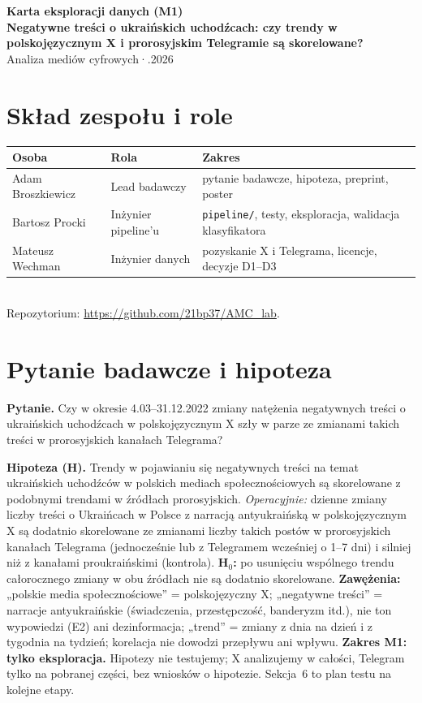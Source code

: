 \documentclass[10pt,a4paper]{article}
\newcommand{\repo}{\url{https://github.com/21bp37/AMC_lab}}
\begin{document}
\begin{center}
{\large\bfseries Karta eksploracji danych (M1)}\\[2pt]
{\bfseries Negatywne treści o ukraińskich uchodźcach: czy trendy w polskojęzycznym X i prorosyjskim Telegramie są skorelowane?}\\[1pt]
\small Analiza mediów cyfrowych\quad·.2026
\end{center}

\section{Skład zespołu i role}
\begin{tabularx}{\linewidth}{@{}llX@{}}
\toprule
Osoba & Rola & Zakres \\
\midrule
Adam Broszkiewicz & Lead badawczy & pytanie badawcze, hipoteza, preprint, poster \\
Bartosz Procki & Inżynier pipeline'u & \texttt{pipeline/}, testy, eksploracja, walidacja klasyfikatora \\
Mateusz Wechman & Inżynier danych & pozyskanie X i Telegrama, licencje, decyzje D1--D3 \\
\bottomrule
\end{tabularx}\\[2pt]
Repozytorium: \repo{}.

\section{Pytanie badawcze i hipoteza}
\textbf{Pytanie.} Czy w okresie 4.03--31.12.2022 zmiany natężenia negatywnych treści o ukraińskich uchodźcach
w polskojęzycznym X szły w parze ze zmianami takich treści w prorosyjskich kanałach Telegrama?

\textbf{Hipoteza (H).} Trendy w pojawianiu się negatywnych treści na temat ukraińskich uchodźców w polskich mediach
społecznościowych są skorelowane z podobnymi trendami w źródłach prorosyjskich. \emph{Operacyjnie:} dzienne zmiany
liczby treści o Ukraińcach w Polsce z narracją antyukraińską w polskojęzycznym X są dodatnio skorelowane ze zmianami
liczby takich postów w prorosyjskich kanałach Telegrama (jednocześnie lub z Telegramem wcześniej o 1--7 dni)
i silniej niż z kanałami proukraińskimi (kontrola). \textbf{H$_0$:} po usunięciu wspólnego trendu całorocznego
zmiany w obu źródłach nie są dodatnio skorelowane. \textbf{Zawężenia:} „polskie media społecznościowe” = polskojęzyczny X;
„negatywne treści” = narracje antyukraińskie (świadczenia, przestępczość, banderyzm itd.), nie ton wypowiedzi (E2) ani dezinformacja;
„trend” = zmiany z dnia na dzień i z tygodnia na tydzień; korelacja nie dowodzi przepływu ani wpływu.
\textbf{Zakres M1: tylko eksploracja.} Hipotezy nie testujemy; X analizujemy w całości, Telegram tylko na pobranej części, bez wniosków o hipotezie.
Sekcja~6 to plan testu na kolejne etapy.
\end{document}
